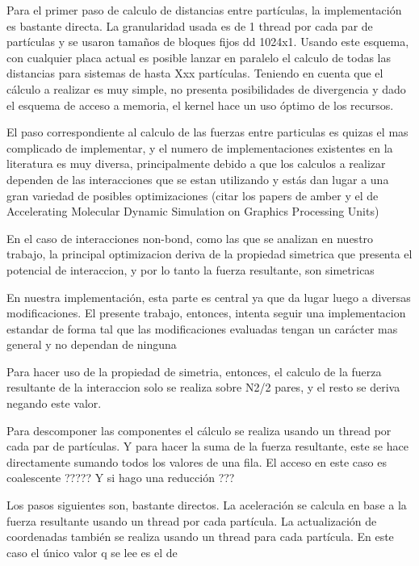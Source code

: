 Para el primer paso de calculo de distancias entre partículas, la implementación es bastante directa. La granularidad usada es de 1 thread por cada par de partículas y se usaron tamaños de bloques fijos dd 1024x1.
Usando este esquema, con cualquier placa actual es posible lanzar en paralelo el calculo de todas las distancias para sistemas de hasta Xxx partículas. Teniendo en cuenta  que  el cálculo a realizar es muy simple, no presenta posibilidades de divergencia y dado el esquema de acceso a memoria, el kernel hace un uso óptimo de los recursos.

El paso correspondiente al calculo de las fuerzas entre particulas es quizas el mas complicado de implementar, y el numero de implementaciones existentes en la literatura es muy diversa, principalmente debido a que los calculos a realizar dependen de las interacciones que se estan utilizando y estás dan lugar a una gran variedad de posibles optimizaciones
\cite{friedrichs2009accelerating}\cite{gotz2012routine}\cite{salomon2013routine}
(citar los papers de amber y el de Accelerating Molecular Dynamic Simulation on Graphics Processing Units)

En el caso de interacciones non-bond, como las que se analizan en nuestro trabajo, la principal optimizacion deriva de la propiedad simetrica que presenta el potencial de interaccion, y por lo tanto la fuerza resultante, son simetricas

En nuestra implementación, esta parte es central ya que da lugar luego a diversas modificaciones. El presente trabajo, entonces, intenta seguir una implementacion estandar de forma tal que las modificaciones evaluadas tengan un carácter mas general y no dependan de ninguna

Para hacer uso de la propiedad de simetria, entonces, el calculo de la fuerza resultante de la interaccion solo se realiza sobre N2/2 pares, y el resto se deriva negando este valor.

Para descomponer las componentes el cálculo se realiza usando un thread por cada par de partículas.
Y para hacer la suma de la fuerza resultante, este se hace directamente sumando todos los valores de una fila. El acceso en este caso es coalescente ????? Y si hago una reducción ???

Los pasos siguientes son, bastante directos.
La aceleración se calcula en base a la fuerza resultante usando un thread por cada partícula.
La actualización de coordenadas también se realiza usando un thread para cada partícula. En este caso el único valor q se lee es el de



